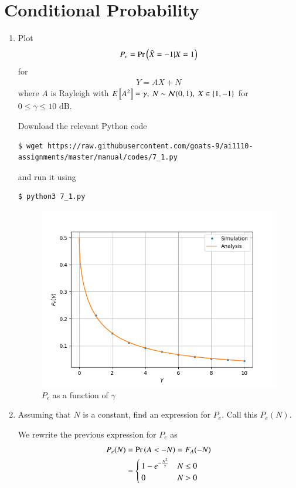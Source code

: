 \documentclass[journal,12pt,twocolumn]{IEEEtran}
\renewcommand\thesection{\arabic{section}}
\begin{document}
\section{Conditional Probability}
\begin{enumerate}[label=\thesection.\arabic*
,ref=\thesection.\theenumi]
\item Plot 
	\begin{align}
		P_e = \Pr\left(\hat{X} = -1|X = 1\right)
	\end{align}
for 
	\begin{align}
		Y = AX + N
	\end{align}
where $A$ is Rayleigh with $E{}\left[A^2\right] = \gamma,\ N \sim \mathcal{N}(0, 1),\ X \in \left\{1, -1\right\}$ for $0 \leq \gamma \leq 10 \text{ dB}$.

\solution
Download the relevant Python code
\begin{lstlisting}
$ wget https://raw.githubusercontent.com/goats-9/ai1110-assignments/master/manual/codes/7_1.py
\end{lstlisting}
and run it using
\begin{lstlisting}
$ python3 7_1.py
\end{lstlisting}
\begin{figure}[!htb]
	\includegraphics[width=\columnwidth]{figs/7_1.png}
	\caption{$P_e$ as a function of $\gamma$}
	\label{fig:err-gamma}
\end{figure}
\item Assuming that $N$ is a constant, find an expression for $P_e$. Call this $P_e(N)$.

\solution
We rewrite the previous expression for $P_e$ as
\begin{align}
	P_e(N) &= \Pr\left(A < -N\right) = F_A(-N) \\
	&= 
	\begin{cases}
		1 - e^{-\frac{N^2}{\gamma}} & N \leq 0 \\
		0 & N > 0
	\end{cases}
\end{align}


\end{enumerate}
\end{document}
